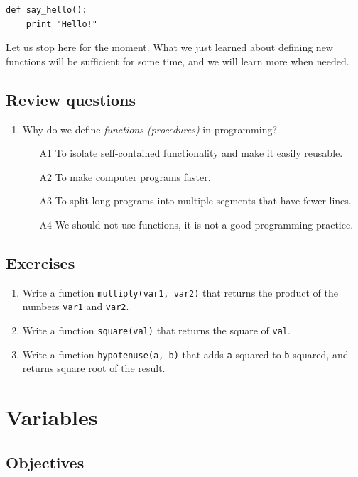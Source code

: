 \documentclass[article,A4,12pt]{llncs}
\begin{document}
\begin{verbatim}
def say_hello():
    print "Hello!"
\end{verbatim}
Let us stop here for the moment. What we just learned about defining new functions will be 
sufficient for some time, and we will learn more when needed.

\subsection{Review questions}

\begin{enumerate}
\item Why do we define {\em functions (procedures)} in programming? 
\begin{enumerate}
\item[A1] To isolate self-contained functionality and make it easily reusable.
\item[A2] To make computer programs faster.
\item[A3] To split long programs into multiple segments that have fewer lines.
\item[A4] We should not use functions, it is not a good programming practice.
\end{enumerate}
\end{enumerate}

\subsection{Exercises}

\begin{enumerate}
\item Write a function {\tt multiply(var1, var2)} that returns the product of the 
      numbers {\tt var1} and {\tt var2}.
\item Write a function {\tt square(val)} that returns the square of {\tt val}.
\item Write a function {\tt hypotenuse(a, b)} that adds {\tt a} squared to {\tt b} squared,
      and returns square root of the result.
\end{enumerate}

\section{Variables}

\subsection{Objectives}
\end{document}
